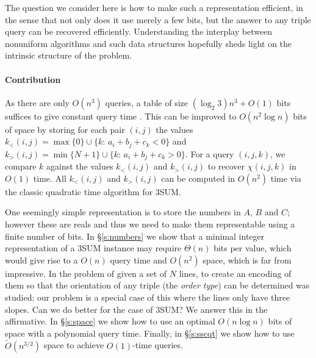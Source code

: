 The question we consider here is how to make such a representation efficient,
in the sense that not only does it use merely a few bits, but the answer to any
triple query can be recovered efficiently. Understanding the interplay between
nonuniform algorithms and such data structures hopefully sheds light on the
intrinsic structure of the problem.

\paragraph{Contribution}

As there are only $O(n^3)$ queries, a table
of size $(\log_2 3) n^3 + O(1)$ bits suffices to give constant query time
\cite{DPT10}. This can be improved to $O(n^2\log n)$ bits of space by
storing for each pair $(i,j)$ the values
\(k_<(i,j) = \max \{ 0\}\cup \{k \colon\, a_i + b_j + c_k < 0\}\) and
\(k_>(i,j) = \min \{ N+1\}\cup \{k \colon\, a_i + b_j + c_k > 0\}\).
For a query \((i,j,k)\), we compare \(k\) against the values \(k_<(i,j)\) and \(k_>(i,j)\)
to recover \(\chi(i,j,k)\) in \(O(1)\) time. All \(k_<(i,j)\) and \(k_>(i,j)\)
can be computed in \(O(n^2)\) time via the classic quadratic time algorithm for
3SUM.

One seemingly simple representation is to store the numbers in $A$, $B$ and
$C$; however these are reals and thus we need to make them representable using
a finite number of bits.
In \S\ref{s:numbers} we show that a minimal integer representation of a
3SUM instance may require $\Theta(n)$ bits per value, which would give
rise to a $O(n)$ query time and $O(n^2)$ space, which is far from
impressive.
In \cite{CCILO19} the problem of given a set of $N$ lines, to create an
encoding of them so that the orientation of any triple (the \emph{order type})
can be determined was studied; our problem is a special case of this where the
lines only have three slopes.
Can we do better for the case of 3SUM? We answer this in the affirmative.
In \S\ref{s:space} we show how to use an optimal $O(n \log n)$ bits of
space with a polynomial query time. Finally, in \S\ref{s:sscqt} we show
how to use $\tilde{O}(n^{3/2})$ space to achieve $O(1)$-time queries.
